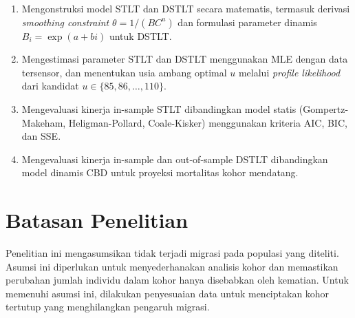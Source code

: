 \begin{enumerate}
    \item Mengonstruksi model STLT dan DSTLT secara matematis, termasuk derivasi \textit{smoothing constraint} $\theta = 1/(BC^u)$ dan formulasi parameter dinamis $B_i = \exp(a + bi)$ untuk DSTLT.

    \item Mengestimasi parameter STLT dan DSTLT menggunakan MLE dengan data tersensor, dan menentukan usia ambang optimal $u$ melalui \textit{profile likelihood} dari kandidat $u \in \{85, 86, \ldots, 110\}$.

    \item Mengevaluasi kinerja in-sample STLT dibandingkan model statis (Gompertz-Makeham, Heligman-Pollard, Coale-Kisker) menggunakan kriteria AIC, BIC, dan SSE.

    \item Mengevaluasi kinerja in-sample dan out-of-sample DSTLT dibandingkan model dinamis CBD untuk proyeksi mortalitas kohor mendatang.
\end{enumerate}

\section{Batasan Penelitian}

 Penelitian ini mengasumsikan tidak terjadi migrasi pada populasi yang diteliti. Asumsi ini diperlukan untuk menyederhanakan analisis kohor dan memastikan perubahan jumlah individu dalam kohor hanya disebabkan oleh kematian. Untuk memenuhi asumsi ini, dilakukan penyesuaian data untuk menciptakan kohor tertutup yang menghilangkan pengaruh migrasi.
